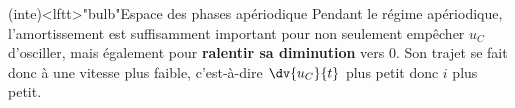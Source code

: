 \documentclass[../../main/main.tex]{subfiles}
\begin{document}
\begin{tcb}[sidebyside, righthand ratio=.3]
	(inte)<lftt>"bulb"{Espace des phases apériodique}
	Pendant le régime apériodique, l'amortissement est suffisamment important pour
	non seulement empêcher $u_C$ d'osciller, mais également pour \textbf{ralentir
		sa diminution }vers $0$. Son trajet se fait donc à une vitesse plus faible,
	c'est-à-dire $\dv{u_C}{t}$ plus petit donc $i$ plus petit.
	\tcblower
	\begin{center}
		\vspace{-15pt}
	\end{center}
\end{tcb}
\end{document}
